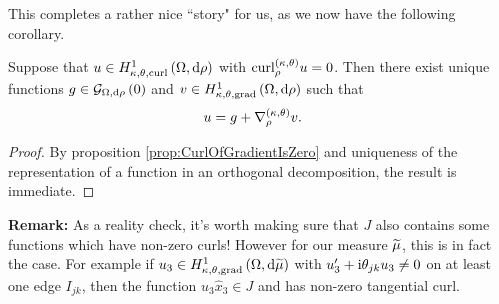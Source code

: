 \documentclass[11pt]{report}
\renewcommand{\ktcurl}[1]{\mathrm{curl}^{\kt}_{#1}}
\begin{document}
This completes a rather nice ``story" for us, as we now have the following corollary.
\begin{cory}
	Suppose that $u\in H^1_{\kappa,\theta,\mathrm{curl}}\left( \Omega, \mathrm{d}\rho \right)$ with $\ktcurl{\rho}u = 0$.
	Then there exist unique functions $g\in\mathcal{G}_{ \Omega, \mathrm{d}\rho}\left( 0 \right)$ and $v\in H^1_{\kappa,\theta,\mathrm{grad}}\left( \Omega, \mathrm{d}\rho \right)$ such that
	\begin{align*}
		u &= g + \nabla^{\left( \kappa, \theta \right)}_\rho v.
	\end{align*}
\end{cory}
\begin{proof}
	By proposition \ref{prop:CurlOfGradientIsZero} and uniqueness of the representation of a function in an orthogonal decomposition, the result is immediate.
\end{proof}

\textbf{Remark:} As a reality check, it's worth making sure that $J$ also contains some functions which have non-zero curls!
However for our measure $\widetilde{\mu}$, this is in fact the case.
For example if $u_3\in H^1_{\kappa,\theta,\mathrm{grad}}\left( \Omega, \mathrm{d}\widetilde{\mu} \right)$ with $u_3'+\mathrm{i}\theta_{jk}u_3\neq 0$ on at least one edge $I_{jk}$, then the function $u_3\hat{x}_3\in J$ and has non-zero tangential curl.
\end{document}
